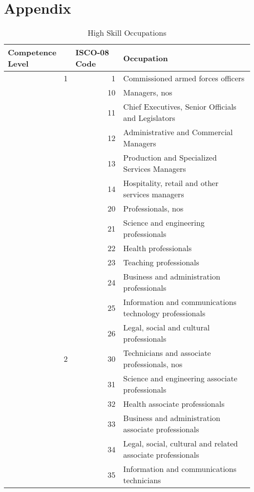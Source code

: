 \documentclass[]{article}
\begin{document}
\section{Appendix}
\begin{table}[H]
  \centering
  \caption{High Skill Occupations}
  \begin{tabular}{rrp{18em}}
    \toprule
    \multicolumn{1}{l}{Competence Level} & \multicolumn{1}{l}{ISCO-08 Code} & \multicolumn{1}{l}{Occupation} \\
    \midrule
    1     & 1     & Commissioned armed forces officers \\
                                         & 10    & Managers, nos \\
                                         & 11    & Chief Executives, Senior Officials and Legislators \\
                                         & 12    & Administrative and Commercial Managers \\
                                         & 13    & Production and Specialized Services Managers \\
                                         & 14    & Hospitality, retail and other services managers \\
                                         & 20    & Professionals, nos \\
                                         & 21    & Science and engineering professionals \\
                                         & 22    & Health professionals \\
                                         & 23    & Teaching professionals \\
                                         & 24    & Business and administration professionals \\
                                         & 25    & Information and communications technology professionals \\
                                         & 26    & Legal, social and cultural professionals \\
    \midrule
    2     & 30    & Technicians and associate professionals, nos \\
                                         & 31    & Science and engineering associate professionals \\
                                         & 32    & Health associate professionals \\
                                         & 33    & Business and administration associate professionals \\
                                         & 34    & Legal, social, cultural and related associate professionals \\
                                         & 35    & Information and communications technicians \\
    \bottomrule
  \end{tabular}%
  \label{tab:occupations_high}%
\end{table}%
\end{document}
